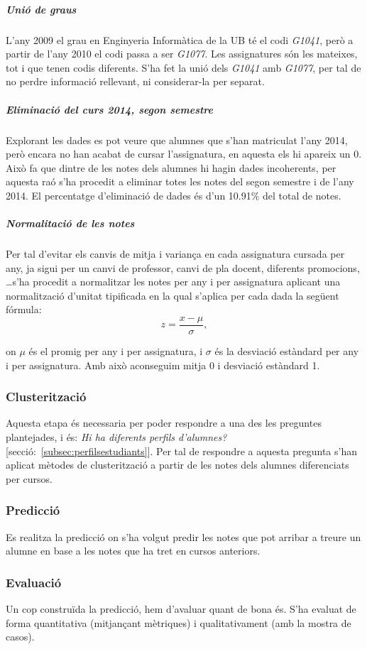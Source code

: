 \documentclass[12pt,a4paper,catalan]{article}
\begin{document}
\subparagraph{Unió de graus}
L'any 2009 el grau en Enginyeria Informàtica de la UB té el codi \textit{G1041}, però a partir de l'any 2010 el codi passa a ser \textit{G1077}. Les assignatures són les mateixes, tot i que tenen codis diferents. S'ha fet la unió dels \textit{G1041} amb \textit{G1077}, per tal de no perdre informació rellevant, ni considerar-la per separat.

\newpage

\subparagraph{Eliminació del curs 2014, segon semestre}
Explorant les dades es pot veure que alumnes que s'han matriculat l'any 2014, però encara no han acabat de cursar l'assignatura, en aquesta els hi apareix un 0. Això fa que dintre de les notes dels alumnes hi hagin dades incoherents, per aquesta raó s'ha procedit a eliminar totes les notes del segon semestre i de l'any 2014. El percentatge d'eliminació de dades és d'un 10.91\% del total de notes.

\subparagraph{Normalitació de les notes}
Per tal d'evitar els canvis de mitja i variança en cada assignatura cursada per any, ja sigui per un canvi de professor, canvi de pla docent, diferents promocions, \ldots s'ha procedit a normalitzar les notes per any i per assignatura aplicant una normalització d'unitat tipificada \cite{normtipificada} en la qual s'aplica per cada dada la següent fórmula:
$$ z = \frac{x - \mu}{\sigma}, $$

on $\mu$ és el promig per any i per assignatura, i $\sigma$ és la desviació estàndard per any i per assignatura. Amb això aconseguim mitja 0 i desviació estàndard 1.

\subsubsection{Clusterització}
Aquesta etapa és necessaria per poder respondre a una des les preguntes plantejades, i és: \textit{Hi ha diferents perfils d'alumnes?} [secció:~\ref{subsec:perfilsestudiants}]. Per tal de  respondre a aquesta pregunta s'han aplicat mètodes de clusterització a partir de les notes dels alumnes diferenciats per cursos.

\subsubsection{Predicció}
Es realitza la predicció on s'ha volgut predir les notes que pot arribar a treure un alumne en base a les notes que ha tret en cursos anteriors.

\subsubsection{Evaluació}
Un cop construïda la predicció, hem d'avaluar quant de bona és. S'ha evaluat de forma quantitativa (mitjançant mètriques) i qualitativament (amb la mostra de casos).
\end{document}
